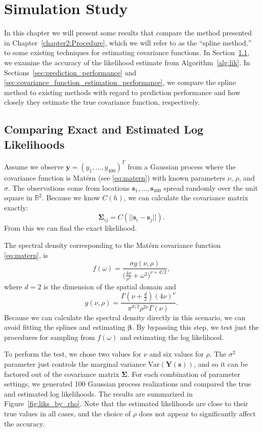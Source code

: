 \chapter{Simulation Study} \label{chapter3:Simulation-Study}

In this chapter we will present some results that compare the method presented in Chapter~\ref{chapter2:Procedure}, which we will refer to as the ``spline method,'' to some existing techniques for estimating covariance functions. In Section~\ref{sec:comparing_exact_and_estimated_log_likelihoods}, we examine the accuracy of the likelihood estimate from Algorithm~\ref{alg:lik}. In Sections~\ref{sec:prediction_performance} and \ref{sec:covariance_function_estimation_performance}, we compare the spline method to existing methods with regard to prediction performance and how closely they estimate the true covariance function, respectively.

\section{Comparing Exact and Estimated Log Likelihoods} %
\label{sec:comparing_exact_and_estimated_log_likelihoods}

Assume we observe $\bm{y} = (y_1, \dots, y_{400})^T$ from a Gaussian process where the covariance function is Mat\'{e}rn (see \eqref{eq:matern}) with known parameters $\nu$, $\rho$, and $\sigma$. The observations come from locations $\bm{s}_1, \dots, \bm{s}_{400}$ spread randomly over the unit square in $\mathbb{R}^2$. Because we know $C(h)$, we can calculate the covariance matrix exactly:
\[
	\bm{\Sigma}_{ij} = C(||\bm{s}_i - \bm{s}_j||).
\]
From this we can find the exact likelihood.

The spectral density corresponding to the Mat\'{e}rn covariance function \eqref{eq:matern}, is
\[
	f(\omega) = \frac{\sigma g(\nu, \rho)}{\big( \frac{4\nu}{\rho^2} + \omega^2 \big)^{\nu+d/2}},
\]
where $d = 2$ is the dimension of the spatial domain and
\[
	g(\nu, \rho) = \frac{\Gamma\left(\nu + \frac{d}{2}\right)(4\nu)^\nu}{\pi^{d/2} \rho^{2\nu} \Gamma(\nu)}.
\]
Because we can calculate the spectral density directly in this scenario, we can avoid fitting the splines and estimating $\bm{\beta}$. By bypassing this step, we test just the procedures for sampling from $f(\omega)$ and estimating the log likelihood.

To perform the test, we chose two values for $\nu$ and six values for $\rho$. The $\sigma^2$ parameter just controls the marginal variance $\textrm{Var}(\bm{Y}(\bm{s}))$, and so it can be factored out of the covariance matrix $\bm{\Sigma}$. For each combination of parameter settings, we generated 100 Gaussian process realizations and compared the true and estimated log likelihoods. The results are summarized in Figure~\ref{fig:liks_by_rho}. Note that the estimated likelihoods are close to their true values in all cases, and the choice of $\rho$ does not appear to significantly affect the accuracy.

